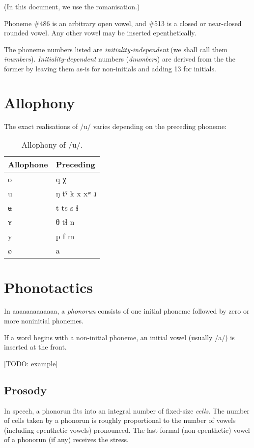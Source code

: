 \documentclass{book}
\newcommand{\lname}{aaaaaaaaaaaaa}
\begin{document}
(In this document, we use the romanisation.)

Phoneme \#486 is an arbitrary open vowel, and \#513 is a closed or near-closed rounded vowel. Any other vowel may be inserted epenthetically.

The phoneme numbers listed are \emph{initiality-independent} (we shall call them \emph{inumbers}). \emph{Initiality-dependent} numbers (\emph{dnumbers}) are derived from the the former by leaving them as-is for non-initials and adding 13 for initials.

\section{Allophony}

The exact realisations of /u/ varies depending on the preceding phoneme:

\begin{table}[ht]
  \caption{Allophony of /u/.}
  \centering
  \begin{tabu}{l|Y}
    Allophone & Preceding \\
    \hline
    o & q χ \\
    u & ŋ tˤ k x xʷ ɹ \\
    ʉ & t ts s ɬ \\
    ʏ & θ tɬ n \\
    y & p f m \\
    ø & a \\
  \end{tabu}
\end{table}

\section{Phonotactics}

In \lname, a \emph{phonorun} consists of one initial phoneme followed by zero or more noninitial phonemes.

If a word begins with a non-initial phoneme, an initial vowel (usually /a/) is inserted at the front.

{}[TODO: example]

\subsection{Prosody}

In speech, a phonorun fits into an integral number of fixed-size \emph{cells}. The number of cells taken by a phonorun is roughly proportional to the number of vowels (including epenthetic vowels) pronounced. The last formal (non-epenthetic) vowel of a phonorun (if any) receives the stress.
\end{document}
